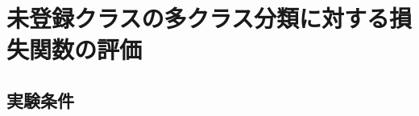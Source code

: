\documentclass[a4paper,11pt,nomag]{jsreport}
\begin{document}



\section{未登録クラスの多クラス分類に対する損失関数の評価}

\subsection{実験条件}
\end{document}
